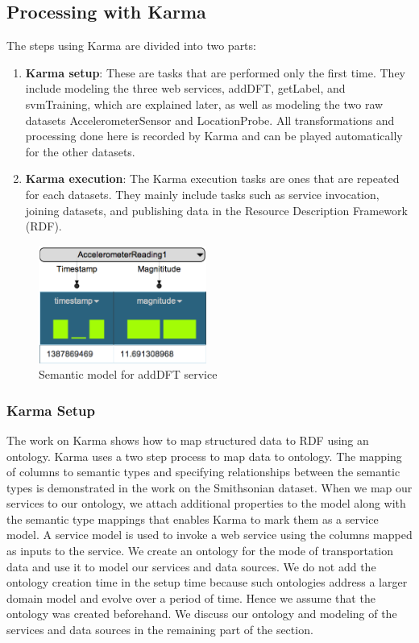\subsection{Processing with Karma}
The steps using Karma are divided into two parts:
\begin{enumerate}
  \item \textbf{Karma setup}: These are tasks that are performed only the first time. They include modeling the three web services, addDFT, getLabel, and svmTraining, which are explained later, as well as modeling the two raw datasets AccelerometerSensor and LocationProbe. All transformations and processing done here is recorded by Karma and can be played automatically for the other datasets. 
  \item \textbf{Karma execution}: The Karma execution tasks are ones that are repeated for each datasets. They mainly include tasks such as service invocation, joining datasets, and publishing data in the Resource Description Framework (RDF).
\end{enumerate} 
\begin{figure}[b]
\centering
\includegraphics[width=55mm]{img/DFTservice}
\caption{Semantic model for addDFT service\label{fig:dftService}}
\end{figure}
\subsubsection{Karma Setup} 
The work on Karma\cite{knoblock12:eswc} shows how to map structured data to RDF using an ontology. Karma uses a two step process to map data to ontology. The mapping of columns to semantic types and specifying relationships between the semantic types is demonstrated in the work on the Smithsonian dataset\cite{szekely14:ijhac}. When we map our services to our ontology, we attach additional properties to the model along with the semantic type mappings that enables Karma to mark them as a service model. A service model is used to invoke a web service using the columns mapped as inputs to the service. We create an ontology for the mode of transportation data and use it to model our services and data sources. We do not add the ontology creation time in the setup time because such ontologies address a larger domain model and evolve over a period of time. Hence we assume that the ontology was created beforehand. We discuss our ontology and modeling of the services and data sources in the remaining part of the section.

